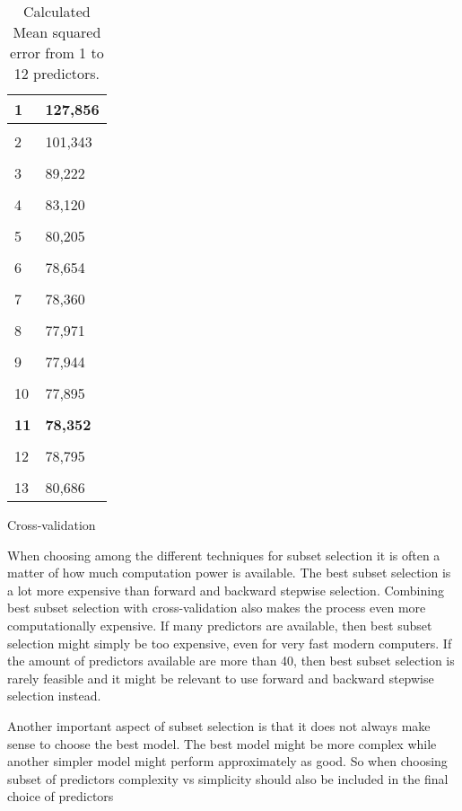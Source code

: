 \begin{table}
\begin{subtable}[t]{2in}
\begin{tabular}{ p{3cm} p{3cm}  }
		1 & 127,856 \\\hline
		\\
		2 & 101,343 \\\hline
		\\
		3 & 89,222 \\\hline
		\\
		4 & 83,120  \\\hline
		\\
		5 & 80,205  \\\hline
		\\
		6 & 78,654  \\\hline
		\\
		7 & 78,360  \\\hline
		\\
		8 & 77,971  \\\hline
		\\
		9 & 77,944  \\\hline
		\\
		10 & 77,895 \\\hline
		\\
		\textbf{11} & \textbf{78,352}  \\\hline
		\\
		12 & 78,795 \\\hline
		\\
		13 & 80,686 \\\hline
	\end{tabular}
		\caption{Cross-validation}\label{table:mse_cross}
	\end{subtable}
	\caption{Calculated Mean squared error from 1 to 12 predictors.}\label{table:mse}
\end{table}

When choosing among the different techniques for subset selection it is often a matter of how much computation power is available.  The best subset selection is a lot more expensive than forward and backward stepwise selection. Combining best subset selection with cross-validation also makes the process even more computationally expensive. If many predictors are available, then best subset selection might simply be too expensive, even for very fast modern computers. If the amount of predictors available are more than 40, then best subset selection is rarely feasible and it might be relevant to use forward and backward stepwise selection instead.

Another important aspect of subset selection is that it does not always make sense to choose the best model. The best model might be more complex while another simpler model might perform approximately as good. So when choosing subset of predictors complexity vs simplicity should also be included in the final choice of predictors